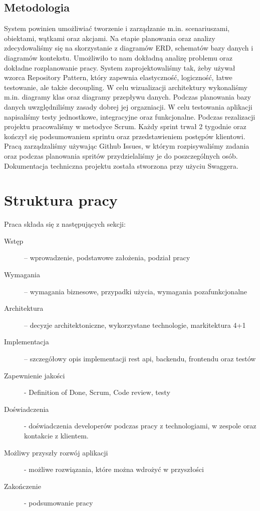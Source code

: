 \subsection{Metodologia}
System powinien umożliwiać tworzenie i zarządzanie m.in. scenariuszami, obiektami, wątkami oraz akcjami. Na etapie planowania oraz analizy
zdecydowaliśmy się na skorzystanie z diagramów ERD, schematów bazy danych i diagramów kontekstu. Umożliwiło to nam dokładną analizę problemu oraz dokładne rozplanowanie pracy.
System zaprojektowaliśmy tak, żeby używał wzorca Repository Pattern, który zapewnia elastyczność, logiczność, łatwe testowanie, ale także decoupling. W celu wizualizacji architektury wykonaliśmy
m.in. diagramy klas oraz diagramy przepływu danych. Podczas planowania bazy danych uwzględniliśmy zasady dobrej jej orgazniacji. W celu testowania aplikacji napisaliśmy testy jednostkowe, integracyjne oraz funkcjonalne.
Podczas rezalizacji projektu pracowaliśmy w metodyce Scrum. Każdy sprint trwał 2 tygodnie oraz kończył się podsumowaniem sprintu oraz przedstawieniem postępów klientowi. Pracą zarządzaliśmy używając Github Issues, w którym rozpisywaliśmy zadania oraz podczas planowania spritów przydzielaliśmy je do poszczególnych osób.
Dokumentacja techniczna projektu została stworzona przy użyciu Swaggera.

\section{Struktura pracy}
Praca składa się z następujących sekcji:
\begin{description}
    \item[Wstęp] -- wprowadzenie, podstawowe założenia, podział pracy
    \item[Wymagania] -- wymagania biznesowe, przypadki użycia, wymagania pozafunkcjonalne
    \item[Architektura] -- decyzje architektoniczne, wykorzystane technologie, markitektura 4+1
    \item[Implementacja] -- szczegółowy opis implementacji rest api, backendu, frontendu oraz testów
    \item[Zapewnienie jakości] - Definition of Done, Scrum, Code review, testy
    \item[Doświadczenia] - doświadczenia developerów podczas pracy z technologiami, w zespole oraz kontakcie z klientem.
    \item[Możliwy przyszły rozwój aplikacji] - możliwe rozwiązania, które można wdrożyć w przyszłości
    \item[Zakończenie] - podsumowanie pracy
\end{description}

